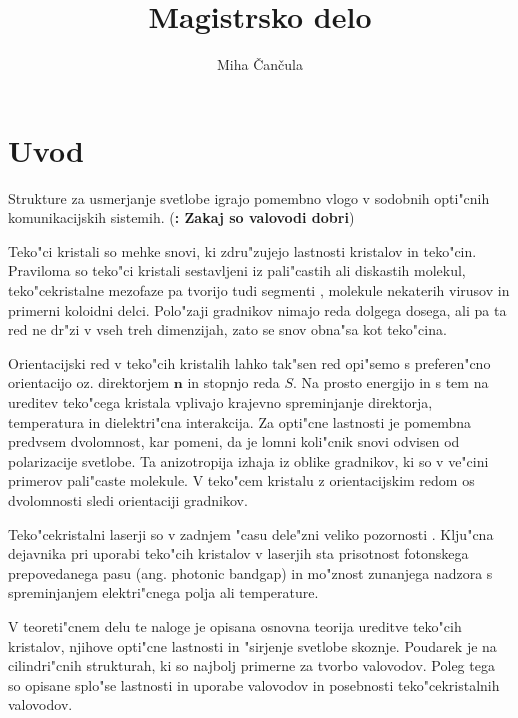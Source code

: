 \documentclass[a4paper,10pt]{article}
\title{Magistrsko delo}
\author{Miha \v Can\v cula}
\newcommand{\todo}[1]{(\textbf{\textsmaller{TODO}: #1})}
\begin{document}
\maketitle

\section{Uvod} %


Strukture za usmerjanje svetlobe igrajo pomembno vlogo v sodobnih opti"cnih komunikacijskih sistemih\cite{ruetschi-1994}. 
\todo{Zakaj so valovodi dobri}




Teko"ci kristali so mehke snovi, ki zdru"zujejo lastnosti kristalov in teko"cin\cite{degennes}. 
Praviloma so teko"ci kristali sestavljeni iz pali"castih ali diskastih molekul, teko"cekristalne mezofaze pa tvorijo tudi segmenti , molekule nekaterih virusov in primerni koloidni delci. 
Polo"zaji gradnikov nimajo reda dolgega dosega, ali pa ta red ne dr"zi v vseh treh dimenzijah, zato se snov obna"sa kot teko"cina. 

Orientacijski red v teko"cih kristalih lahko tak"sen red opi"semo s preferen"cno orientacijo oz. direktorjem $\mathbf{n}$ in stopnjo reda $S$. 
Na prosto energijo in s tem na ureditev teko"cega kristala vplivajo krajevno spreminjanje direktorja, temperatura in dielektri"cna interakcija. 
Za opti"cne lastnosti je pomembna predvsem dvolomnost, kar pomeni, da je lomni koli"cnik snovi odvisen od polarizacije svetlobe. 
Ta anizotropija izhaja iz oblike gradnikov, ki so v ve"cini primerov pali"caste molekule. 
V teko"cem kristalu z orientacijskim redom os dvolomnosti sledi orientaciji gradnikov. 


Teko"cekristalni laserji so v zadnjem "casu dele"zni veliko pozornosti \cite{coles-morris, humar-musevic, humar-ravnik}. 
Klju"cna dejavnika pri uporabi teko"cih kristalov v laserjih sta prisotnost fotonskega prepovedanega pasu (ang. photonic bandgap) in mo"znost zunanjega nadzora s spreminjanjem elektri"cnega polja ali temperature. 

V teoreti"cnem delu te naloge je opisana osnovna teorija ureditve teko"cih kristalov, njihove opti"cne lastnosti in "sirjenje svetlobe skoznje. 
Poudarek je na cilindri"cnih strukturah, ki so najbolj primerne za tvorbo valovodov. 
Poleg tega so opisane splo"se lastnosti in uporabe valovodov in posebnosti teko"cekristalnih valovodov. 
\end{document}

